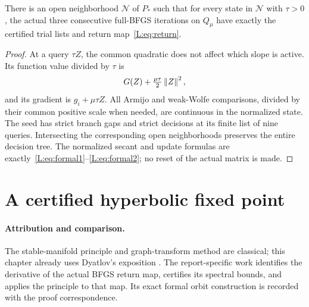 \begin{lemma}\label{L:lem:agreement}
There is an open neighborhood $\mathcal N$ of $P_*$ such that for every state in $\mathcal N$ with $\tau>0$, the actual three consecutive full-BFGS iterations on $Q_\mu$ have exactly the certified trial lists and return map~\eqref{L:eq:return}.
\end{lemma}
\begin{proof}
At a query $\tau Z$, the common quadratic does not affect which slope is active. Its function value divided by $\tau$ is
\[
 G(Z)+\tfrac{\mu\tau}{2}\left\lVert Z\right\rVert^2,
\]
and its gradient is $g_i+\mu\tau Z$. All Armijo and weak-Wolfe comparisons, divided by their common positive scale when needed, are continuous in the normalized state. The seed has strict branch gaps and strict decisions at its finite list of nine queries. Intersecting the corresponding open neighborhoods preserves the entire decision tree. The normalized secant and update formulas are exactly~\eqref{L:eq:formal1}--\eqref{L:eq:formal2}; no reset of the actual matrix is made.
\end{proof}


\setcounter{section}{3}
\setcounter{theorem}{2}
\setcounter{lemma}{1}
\setcounter{corollary}{0}
\setcounter{proposition}{0}
\setcounter{remark}{0}
\setcounter{equation}{2}
\section{A certified hyperbolic fixed point}
\paragraph{Attribution and comparison.}
The stable-manifold principle and graph-transform method are classical; this chapter already uses Dyatlov's exposition \cite[Sections 3--4]{DY}. The report-specific work identifies the derivative of the actual BFGS return map, certifies its spectral bounds, and applies the principle to that map. Its exact formal orbit construction is recorded with the proof correspondence.


